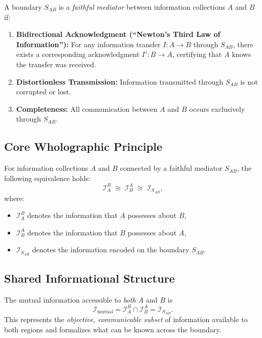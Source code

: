 ﻿\documentclass[12pt]{article}
\begin{document}
\begin{definition}
A boundary $S_{AB}$ is a \emph{faithful mediator} between information collections $A$ and $B$ if:
\begin{enumerate}
    \item \textbf{Bidirectional Acknowledgment (``Newton's Third Law of Information''):} For any information transfer $I: A \rightarrow B$ through $S_{AB}$, there exists a corresponding acknowledgment $I': B \rightarrow A$, certifying that $A$ knows the transfer was received.
    \item \textbf{Distortionless Transmission:} Information transmitted through $S_{AB}$ is not corrupted or lost.
    \item \textbf{Completeness:} All communication between $A$ and $B$ occurs exclusively through $S_{AB}$.
\end{enumerate}
\end{definition}


\subsection{Core Wholographic Principle}


\begin{principle}
For information collections $A$ and $B$ connected by a faithful mediator $S_{AB}$, the following equivalence holds:
\begin{equation}
    \mathcal{I}_{A}^{B} \;\cong\; \mathcal{I}_{B}^{A} \;\cong\; \mathcal{I}_{S_{AB}},
\end{equation}
where:
\begin{itemize}
    \item $\mathcal{I}_{A}^{B}$ denotes the information that $A$ possesses about $B$,
    \item $\mathcal{I}_{B}^{A}$ denotes the information that $B$ possesses about $A$,
    \item $\mathcal{I}_{S_{AB}}$ denotes the information encoded on the boundary $S_{AB}$.
\end{itemize}
\end{principle}


\subsection{Shared Informational Structure}


The mutual information accessible to \emph{both} $A$ and $B$ is
\begin{equation}
    \mathcal{I}_{\mathrm{mutual}} = \mathcal{I}_{A}^{B} \cap \mathcal{I}_{B}^{A} = \mathcal{I}_{S_{AB}}.
\end{equation}
This represents the \emph{objective, communicable subset} of information available to both regions and formalizes what can be known across the boundary.
\end{document}
